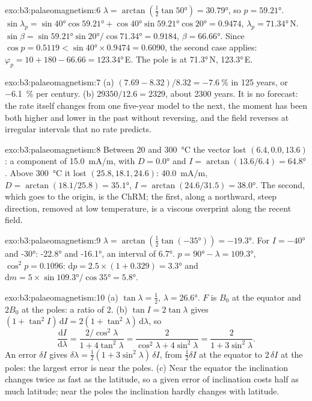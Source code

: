 \begin{solution}{exo:b3:palaeomagnetism:6}
$\lambda = \arctan(\tfrac12\tan\ang{50}) = \ang{30.79}$, so $p = \ang{59.21}$.
$\sin\lambda_p = \sin\ang{40}\cos\ang{59.21} + \cos\ang{40}\sin\ang{59.21}
\cos\ang{20} = 0.9474$, $\lambda_p = \ang{71.34}$\,N. $\sin\beta =
\sin\ang{59.21}\sin\ang{20}/\cos\ang{71.34} = 0.9184$, $\beta = \ang{66.66}$.
Since $\cos p = 0.5119 < \sin\ang{40}\times0.9474 = 0.6090$, the second case
applies: $\varphi_p = 10 + 180 - 66.66 = \ang{123.34}$\,E. The pole is at
\ang{71.3}\,N, \ang{123.3}\,E.
\end{solution}

\begin{solution}{exo:b3:palaeomagnetism:7}
(a) $(7.69 - 8.32)/8.32 = \qty{-7.6}{\percent}$ in 125 years, or
\qty{-6.1}{\percent} per century. (b) $29350/12.6 = 2329$, about 2300 years.
It is no forecast: the rate itself changes from one five-year model to the
next, the moment has been both higher and lower in the past without
reversing, and the field reverses at irregular intervals that no rate
predicts.
\end{solution}

\begin{solution}{exo:b3:palaeomagnetism:8}
Between 20 and \qty{300}{\celsius} the vector lost $(6.4, 0.0, 13.6)$: a
component of \qty{15.0}{mA/m}, with $D = \ang{0.0}$ and
$I = \arctan(13.6/6.4) = \ang{64.8}$. Above \qty{300}{\celsius} it lost $(25.8, 18.1, 24.6)$:
\qty{40.0}{mA/m}, $D = \arctan(18.1/25.8) = \ang{35.1}$, $I =
\arctan(24.6/31.5) = \ang{38.0}$. The second, which goes to the origin, is the
ChRM; the first, along a northward, steep direction, removed at low
temperature, is a viscous overprint along the recent field.
\end{solution}

\begin{solution}{exo:b3:palaeomagnetism:9}
$\lambda = \arctan(\tfrac12\tan(\ang{-35})) = \ang{-19.3}$. For $I = \ang{-40}$
and \ang{-30}: \ang{-22.8} and \ang{-16.1}, an interval of \ang{6.7}.
$p = \ang{90} - \lambda = \ang{109.3}$, $\cos^2p = 0.1096$:
$\mathrm dp = 2.5\times(1 + 0.329) = \ang{3.3}$ and $\mathrm dm =
5\times\sin\ang{109.3}/\cos\ang{35} = \ang{5.8}$.
\end{solution}

\begin{solution}{exo:b3:palaeomagnetism:10}
(a) $\tan\lambda = \tfrac12$, $\lambda = \ang{26.6}$. $F$ is $B_0$ at the
equator and $2B_0$ at the poles: a ratio of 2. (b) $\tan I = 2\tan\lambda$
gives $(1 + \tan^2I)\,\mathrm dI = 2(1 + \tan^2\lambda)\,\mathrm d\lambda$, so
\[
  \frac{\mathrm dI}{\mathrm d\lambda} = \frac{2/\cos^2\lambda}{1 + 4\tan^2\lambda}
  = \frac{2}{\cos^2\lambda + 4\sin^2\lambda} = \frac{2}{1 + 3\sin^2\lambda}.
\]
An error $\delta I$ gives $\delta\lambda = \tfrac12(1 + 3\sin^2\lambda)\,\delta I$,
from $\tfrac12\delta I$ at the equator to $2\,\delta I$ at the poles: the
largest error is near the poles. (c) Near the equator the inclination changes
twice as fast as the latitude, so a given error of inclination costs half as
much latitude; near the poles the inclination hardly changes with latitude.
\end{solution}

